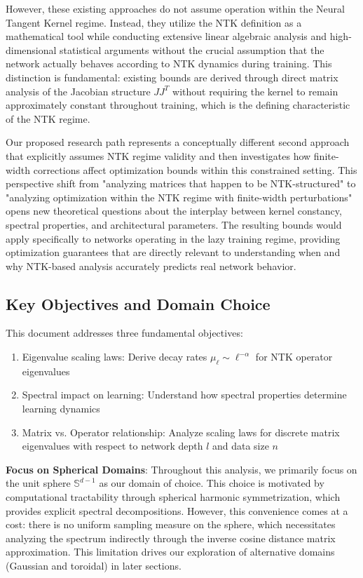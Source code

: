 \documentclass{article}
\begin{document}
However, these existing approaches do not assume operation within the Neural Tangent Kernel regime. Instead, they utilize the NTK definition as a mathematical tool while conducting extensive linear algebraic analysis and high-dimensional statistical arguments without the crucial assumption that the network actually behaves according to NTK dynamics during training. This distinction is fundamental: existing bounds are derived through direct matrix analysis of the Jacobian structure $JJ^T$ without requiring the kernel to remain approximately constant throughout training, which is the defining characteristic of the NTK regime.

Our proposed research path represents a conceptually different second approach that explicitly assumes NTK regime validity and then investigates how finite-width corrections affect optimization bounds within this constrained setting. This perspective shift from "analyzing matrices that happen to be NTK-structured" to "analyzing optimization within the NTK regime with finite-width perturbations" opens new theoretical questions about the interplay between kernel constancy, spectral properties, and architectural parameters. The resulting bounds would apply specifically to networks operating in the lazy training regime, providing optimization guarantees that are directly relevant to understanding when and why NTK-based analysis accurately predicts real network behavior.

\subsection{Key Objectives and Domain Choice}

This document addresses three fundamental objectives:
\begin{enumerate}
\item Eigenvalue scaling laws: Derive decay rates $\mu_\ell \sim \ell^{-\alpha}$ for NTK operator eigenvalues
\item Spectral impact on learning: Understand how spectral properties determine learning dynamics  
\item Matrix vs. Operator relationship: Analyze scaling laws for discrete matrix eigenvalues with respect to network depth $l$ and data size $n$
\end{enumerate}

\textbf{Focus on Spherical Domains}: Throughout this analysis, we primarily focus on the unit sphere $\mathbb{S}^{d-1}$ as our domain of choice. This choice is motivated by computational tractability through spherical harmonic symmetrization, which provides explicit spectral decompositions. However, this convenience comes at a cost: there is no uniform sampling measure on the sphere, which necessitates analyzing the spectrum indirectly through the inverse cosine distance matrix approximation. This limitation drives our exploration of alternative domains (Gaussian and toroidal) in later sections.
\end{document}
